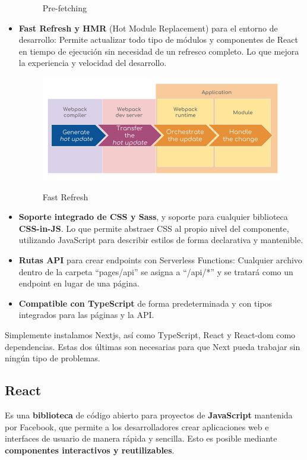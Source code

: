 \documentclass[12pt,twoside,titlepage]{report}
\begin{document}
\begin{itemize}
\begin{figure}[H]
            \label{fig:nextjs_prefetch}
            \caption{Pre-fetching}
        \end{figure}
    \item \textbf{Fast Refresh y HMR} (Hot Module Replacement) para el entorno de desarrollo: Permite actualizar todo tipo de módulos y componentes de React en tiempo de ejecución sin necesidad de un refresco completo. Lo que mejora la experiencia y velocidad del desarrollo.
        \begin{figure}[H]
            \centering
            \includegraphics[scale=0.33]{Nextjs/FastRefresh}
            \label{fig:nextjs_hmr}
            \caption{Fast Refresh}
        \end{figure}    
    \item \textbf{Soporte integrado de CSS y Sass}, y soporte para cualquier biblioteca \textbf{CSS-in-JS}. Lo que permite abstraer CSS al propio nivel del componente, utilizando JavaScript para describir estilos de forma declarativa y mantenible.
    \item \textbf{Rutas API} para crear endpoints con Serverless Functions: Cualquier archivo dentro de la carpeta ``pages/api'' se asigna a ``/api/*'' y se tratará como un endpoint en lugar de una página.
    \item \textbf{Compatible con TypeScript} de forma predeterminada y con tipos integrados para las páginas y la API.
\end{itemize}

Simplemente instalamos Nextjs, así como TypeScript, React y React-dom como dependencias. Estas dos últimas son necesarias para que Next pueda trabajar sin ningún tipo de problemas.

\subsection{React}

Es una \textbf{biblioteca} de código abierto para proyectos de \textbf{JavaScript} mantenida por Facebook, que permite a los desarrolladores crear aplicaciones web e interfaces de usuario de manera rápida y sencilla. Esto es posible mediante \textbf{componentes interactivos y reutilizables}.
\end{document}
